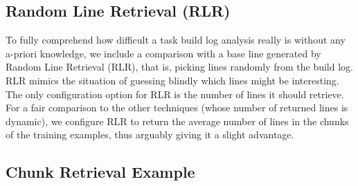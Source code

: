 \subsection{Random Line Retrieval (RLR)}
\label{sec:expl-rlr}

To fully comprehend how difficult a task build log analysis really
is without any a-priori knowledge, we include a comparison with a
base line generated by Random Line Retrieval (RLR), that is,
picking lines randomly from the build log.
RLR mimics the
situation of guessing blindly which lines might be interesting.
The only configuration option for RLR is the number of lines it should
retrieve.
For a fair comparison to the other techniques (whose number of
returned lines is dynamic), we configure RLR to return the average
number of lines in the chunks of the training examples, thus arguably
giving it a slight advantage.

\subsection{Chunk Retrieval Example}
\label{sec:crt-example}

